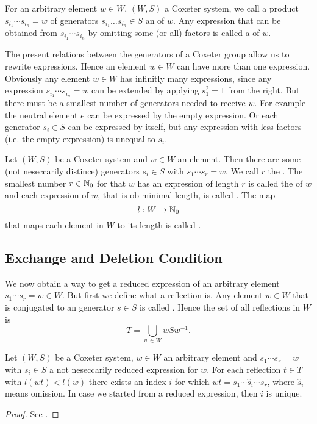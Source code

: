 \begin{defi}
	For an arbitrary element $w \in W$, $(W,S)$ a Coxeter system, we call a product $s_{i_1} \cdots s_{i_n} = w$ of generators $s_{i_1} \ldots s_{i_n} \in S$ an  of $w$. Any expression that can be obtained from $s_{i_1} \cdots s_{i_n}$ by omitting some (or all) factors is called a  of $w$.
\end{defi}

The present relations between the generators of a Coxeter group allow us to rewrite expressions. Hence an element $w \in W$ can have more than one expression. Obviously any element $w \in W$ has infinitly many expressions, since any expression $s_{i_1} \cdots s_{i_n} = w$ can be extended by applying $s_1^2 = 1$ from the right. But there must be a smallest number of generators needed to receive $w$. For example the neutral element $e$ can be expressed by the empty expression. Or each generator $s_i \in S$ can be expressed by itself, but any expression with less factors (i.e. the empty expression) is unequal to $s_i$.

\begin{defi}
	\label{length-function}
	Let $(W,S)$ be a Coxeter system and $w \in W$ an element. Then there are some (not neseccarily distince) generators $s_i \in S$ with $s_1 \cdots s_r = w$. We call $r$ the . The smallest number $r \in \mathbb{N}_0$ for that $w$ has an expression of length $r$ is called the  of $w$ and each expression of $w$, that is ob minimal length, is called . The map
	$$ l : W \to \mathbb{N}_0 $$
	that maps each element in $W$ to its length is called .
\end{defi}

\subsection{Exchange and Deletion Condition}

We now obtain a way to get a reduced expression of an arbitrary element $s_1 \cdots s_r = w \in W$. But first we define what a reflection is. Any element $w \in W$ that is conjugated to an generator $s \in S$ is called . Hence the set of all reflections in $W$ is
$$ T = \bigcup_{w \in W} wSw^{-1}. $$

\begin{theo}
	\label{strong-exchange-condition}
	Let $(W,S)$ be a Coxeter system, $w \in W$ an arbitrary element and ${s_1 \cdots s_r = w}$ with $s_i \in S$ a not neseccarily reduced expression for $w$. For each reflection $t \in T$ with $l(wt) < l(w)$ there exists an index $i$ for which $wt = s_1 \cdots \hat s_i \cdots s_r$, where $\hat s_i$ means omission. In case we started from a reduced expression, then $i$ is unique.

	\begin{proof}
		See \cite[Theorem 5.8]{humphreys:coxeter}.
	\end{proof}
\end{theo}


